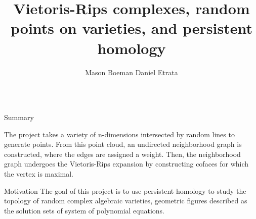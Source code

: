\documentclass{beamer}
\title{Vietoris-Rips complexes, random points on varieties, and persistent homology}
\author{Mason Boeman \quad Daniel Etrata}
\institute{Mentors: Benjamin Antieau and J\={a}nis Lazovskis}
\begin{document}
\begin{frame}{}
\begin{columns}[t]

\begin{column}{0.32\linewidth}

\begin{block}{Summary}

The project takes a variety of n-dimensions intersected by random lines to generate points. From this point cloud, an undirected neighborhood graph is constructed,
where the edges are assigned a weight. Then, the neighborhood graph undergoes the Vietoris-Rips expansion by constructing cofaces for which the vertex is maximal.
\end{block}



\begin{block}{Motivation}
The goal of this project is to use persistent homology to study the topology of random complex algebraic varieties,
geometric figures described as the solution sets of system of polynomial equations. 

\end{block}


\end{column}
\end{columns}
\end{frame}
\end{document}
